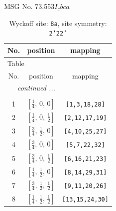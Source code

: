 \documentclass[fleqn,8pt]{jsarticle}
\begin{document}
\setcounter{MaxMatrixCols}{32}

\renewcommand{\tablename}{Table~}
\renewcommand{\figurename}{Figure~}
\begin{center}
\LARGE
MSG No. 73.553\quad$I_{c}bca$
\end{center}
\renewcommand{\arraystretch}{1.2}
\begin{longtable}{ccc}
\caption{Wyckoff site: {\tt 8a}, site symmetry: {\tt 2'22'}}
 \\
 \hline \hline
No. & position & mapping \\ \hline \endfirsthead

\multicolumn{2}{l}{\tablename\ \thetable{}} \\
 \hline \hline
No. & position & mapping \\ \hline \endhead

 \hline \hline
\multicolumn{2}{r}{\footnotesize\it continued ...} \\ \endfoot

 \hline \hline
\multicolumn{2}{r}{} \\ \endlastfoot

1 & $\left[ \frac{1}{4},\, 0,\, 0 \right]$ & {\tt [1,3,18,28]} \\ \hline
2 & $\left[ \frac{1}{4},\, 0,\, \frac{1}{2} \right]$ & {\tt [2,12,17,19]} \\ \hline
3 & $\left[ \frac{3}{4},\, \frac{1}{2},\, 0 \right]$ & {\tt [4,10,25,27]} \\ \hline
4 & $\left[ \frac{3}{4},\, 0,\, 0 \right]$ & {\tt [5,7,22,32]} \\ \hline
5 & $\left[ \frac{3}{4},\, 0,\, \frac{1}{2} \right]$ & {\tt [6,16,21,23]} \\ \hline
6 & $\left[ \frac{1}{4},\, \frac{1}{2},\, 0 \right]$ & {\tt [8,14,29,31]} \\ \hline
7 & $\left[ \frac{3}{4},\, \frac{1}{2},\, \frac{1}{2} \right]$ & {\tt [9,11,20,26]} \\ \hline
8 & $\left[ \frac{1}{4},\, \frac{1}{2},\, \frac{1}{2} \right]$ & {\tt [13,15,24,30]} \\
\end{longtable}
\renewcommand{\arraystretch}{1.2}
\end{document}
